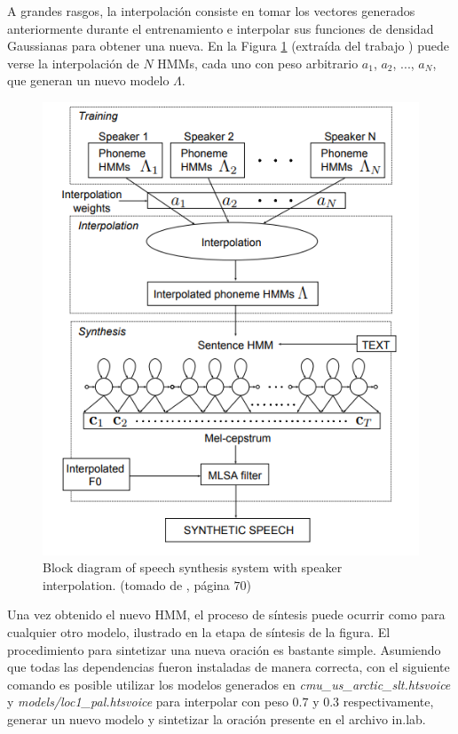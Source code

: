 A grandes rasgos, la interpolación consiste en tomar los vectores generados anteriormente durante el entrenamiento e interpolar sus funciones de densidad Gaussianas para obtener una nueva. En la Figura \ref{spekerInterpolationImagen} (extraída del trabajo \cite{SpekerInterpolationRef}) puede verse la interpolación de $N$ HMMs, cada uno con peso arbitrario $a_1$, $a_2$, ..., $a_N$, que generan un nuevo modelo $\Lambda$.

\begin{figure}
\begin{center}
\includegraphics[scale=0.4]{imagenes/speakerInterpolation.png}
\caption{Block diagram of speech synthesis system with speaker interpolation. (tomado de \cite{phoneticAndProsodic}, página $70$) }
\label{spekerInterpolationImagen}
\end{center}
\end{figure}

Una vez obtenido el nuevo HMM, el proceso de síntesis puede ocurrir como para cualquier otro modelo, ilustrado en la etapa de síntesis de la figura. El procedimiento para sintetizar una nueva oración es bastante simple. Asumiendo que todas las dependencias fueron instaladas de manera correcta, con el siguiente comando es posible utilizar los modelos generados en \textit{cmu\_us\_arctic\_slt.htsvoice} y \textit{models/loc1\_pal.htsvoice} para interpolar con peso $0.7$ y $0.3$ respectivamente, generar un nuevo modelo y sintetizar la oración presente en el archivo in.lab.


